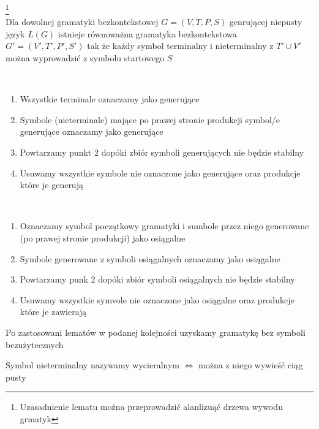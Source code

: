 	\begin{lemat}\footnote{Uzasadnienie lematu można przeprowadzić alanlizuąć drzewa wywodu grmatyk}~\\
		Dla dowolnej gramatyki bezkontekstowej $G = (V, T, P, S)$ genrującej niepusty język $L(G)$ istnieje równoważna gramatyka
		bezkontekstowa $G' = (V', T', P', S')$ tak że każdy symbol terminalny i nieterminalny z $T' \cup V'$ można wyprowadzić
		z  symbolu startowego $S$
	\end{lemat}		
	
	\begin{alg}~\\
		\begin{enumerate}
			\item Wszystkie terminale oznaczamy jako generujące
			\item Symbole (nieterminale) mające po prawej stronie produkcji symbol/e generujące oznaczamy jako generujące
			\item Powtarzamy punkt 2 dopóki zbiór symboli generujących nie będzie stabilny
			\item Usuwamy wszystkie symbole nie oznaczone jako generujące oraz produkcje które je generują
		\end{enumerate}
	\end{alg}
	
	\begin{alg}~\\
		\begin{enumerate}
			\item Oznaczamy symbol początkowy gramatyki i sumbole przez niego generowane (po prawej stronie produkcji)
			jako osiągalne
			\item Symbole generowane z symboli osiągalnych oznaczamy jako osiągalne
			\item Powtarzamy punk 2 dopóki zbiór symboli osiągalnych nie będzie stabilny
			\item Usuwamy wszystkie symvole nie oznaczone jako osiągalne oraz produkcje które je zawierają
		\end{enumerate}
	\end{alg}	
	
	\begin{tw}
		Po zastosowani lematów w podanej kolejności uzyskamy gramatykę bez symboli bezużytecznych
	\end{tw}
	
	\begin{df}
		Symbol nieterminalny nazywamy wycieralnym $\Leftrightarrow$ można z niego wywieść ciąg pusty
	\end{df}		

